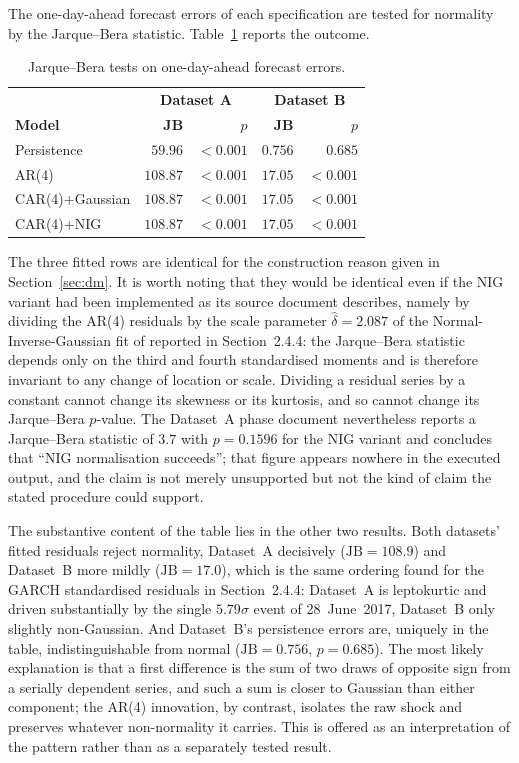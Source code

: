 \documentclass[11pt, a4paper, twoside]{article}
\begin{document}
The one-day-ahead forecast errors of each specification are tested for normality by the Jarque--Bera statistic. Table~\ref{tab:jb} reports the outcome.

\begin{table}[htbp]
\centering
\caption{Jarque--Bera tests on one-day-ahead forecast errors.}
\label{tab:jb}
\begin{tabular}{l r r r r}
\toprule
& \multicolumn{2}{c}{\textbf{Dataset A}} & \multicolumn{2}{c}{\textbf{Dataset B}} \\
\textbf{Model} & \textbf{JB} & \textbf{$p$} & \textbf{JB} & \textbf{$p$} \\
\midrule
Persistence & $59.96$ & $<0.001$ & $0.756$ & $0.685$ \\
AR(4) & $108.87$ & $<0.001$ & $17.05$ & $<0.001$ \\
CAR(4)+Gaussian & $108.87$ & $<0.001$ & $17.05$ & $<0.001$ \\
CAR(4)+NIG & $108.87$ & $<0.001$ & $17.05$ & $<0.001$ \\
\bottomrule
\end{tabular}
\end{table}

The three fitted rows are identical for the construction reason given in Section~\ref{sec:dm}. It is worth noting that they would be identical even if the NIG variant had been implemented as its source document describes, namely by dividing the AR(4) residuals by the scale parameter $\hat\delta = 2.087$ of the Normal-Inverse-Gaussian fit of \citet{BarndorffNielsenShephard2001} reported in Section~2.4.4: the Jarque--Bera statistic depends only on the third and fourth standardised moments and is therefore invariant to any change of location or scale. Dividing a residual series by a constant cannot change its skewness or its kurtosis, and so cannot change its Jarque--Bera $p$-value. The Dataset~A phase document nevertheless reports a Jarque--Bera statistic of $3.7$ with $p = 0.1596$ for the NIG variant and concludes that ``NIG normalisation succeeds''; that figure appears nowhere in the executed output, and the claim is not merely unsupported but not the kind of claim the stated procedure could support.

The substantive content of the table lies in the other two results. Both datasets' fitted residuals reject normality, Dataset~A decisively ($\mathrm{JB} = 108.9$) and Dataset~B more mildly ($\mathrm{JB} = 17.0$), which is the same ordering found for the GARCH standardised residuals in Section~2.4.4: Dataset~A is leptokurtic and driven substantially by the single $5.79\sigma$ event of 28~June~2017, Dataset~B only slightly non-Gaussian. And Dataset~B's persistence errors are, uniquely in the table, indistinguishable from normal ($\mathrm{JB} = 0.756$, $p = 0.685$). The most likely explanation is that a first difference is the sum of two draws of opposite sign from a serially dependent series, and such a sum is closer to Gaussian than either component; the AR(4) innovation, by contrast, isolates the raw shock and preserves whatever non-normality it carries. This is offered as an interpretation of the pattern rather than as a separately tested result.
\end{document}
